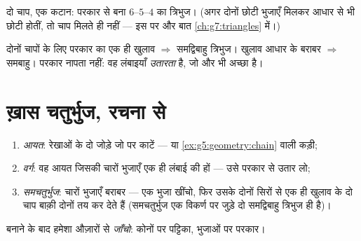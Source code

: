 \begin{omfigure}

{\small दो चाप, एक कटान: परकार से बना $6$--$5$--$4$ का त्रिभुज।
(अगर दोनों छोटी भुजाएँ मिलकर आधार से भी छोटी होतीं, तो चाप मिलते
ही नहीं --- इस पर और बात
\cref{ch:g7:triangles} में।)}
\end{omfigure}

\begin{example}\label{ex:g5:geometry:special}
दोनों चापों के लिए परकार का एक ही खुलाव $\Rightarrow$ समद्विबाहु
त्रिभुज। खुलाव आधार के बराबर $\Rightarrow$ समबाहु। परकार नापता
नहीं: वह लंबाइयाँ \emph{उतारता} है, जो और भी अच्छा है।
\end{example}

\section{ख़ास चतुर्भुज, रचना से}

\begin{method}[परिवार बनाना]\label{met:g5:geometry:quadrilaterals}
\begin{enumerate}
  \item \emph{आयत}:  रेखाओं के दो जोड़े जो  पर
        काटें --- या \cref{ex:g5:geometry:chain} वाली कड़ी;
  \item \emph{वर्ग}: वह आयत जिसकी चारों भुजाएँ एक ही लंबाई की
        हों --- उसे परकार से उतार लो;
  \item \emph{समचतुर्भुज}: चारों भुजाएँ बराबर --- एक भुजा खींचो,
        फिर उसके दोनों सिरों से एक ही खुलाव के दो चाप बाक़ी दोनों
         तय कर देते हैं (समचतुर्भुज एक विकर्ण पर जुड़े दो
        समद्विबाहु त्रिभुज ही है)।
\end{enumerate}
बनाने के बाद हमेशा औज़ारों से \emph{जाँचो}: कोनों पर 
पट्टिका, भुजाओं पर परकार।
\end{method}

